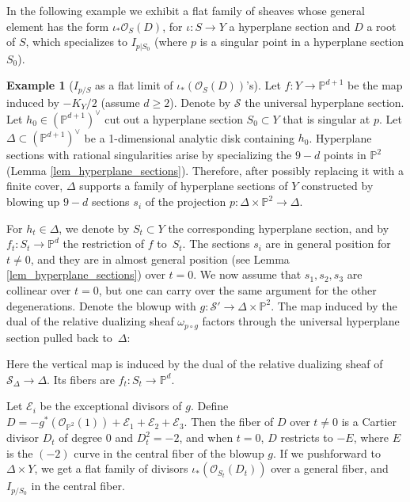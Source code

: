 \documentclass[11pt]{amsart}
\theoremstyle{definition}
\newtheorem{example}[thm]{Example}
\newcommand{\pr}[1]{\mathbb P^{#1}}
\newcommand{\sO}{\mathcal{O}}
\newcommand{\sS}{\mathcal{S}}
\newcommand{\sE}{\mathcal{E}}
\newcommand{\AAA}[1]{\textcolor{red}{#1}}
\renewcommand{\P}{\mathbb{P}}
\begin{document}
In the following example we exhibit a flat family of sheaves whose general element has the form $\iota_*\sO_S(D)$, for $\iota\colon S \to Y$ a hyperplane section and $D$ a root of $S$, which specializes to $I_{p|S_0}$ (where $p$ is a singular point in a hyperplane section $S_0$).

\begin{example}[$I_{p/S}$ as a flat limit of $\iota_*(\sO_S(D))$'s]\label{explicitfamily}
Let $f:Y\rightarrow \pr{d+1}$ be the map induced by $-K_Y/2$ (assume $d\geq 2$). Denote by $\sS$ the universal hyperplane section. Let $h_0\in (\P^{d+1})^\vee$ cut out a hyperplane section  $S_0\subset Y$ that is singular at $p$. 
Let $\Delta\subset (\P^{d+1})^\vee$ be a 1-dimensional analytic disk containing $h_0$. Hyperplane sections with rational singularities arise by specializing the $9-d$ points in $\pr 2$ (Lemma \ref{lem_hyperplane_sections}). Therefore, after possibly replacing it with a finite cover, $\Delta$ supports a family of hyperplane sections of $Y$ constructed by blowing up $9-d$ sections $s_i$ of the projection $p:\Delta\times \pr 2\rightarrow \Delta$.

For $h_t\in \Delta$, we denote by $S_t\subset Y$ the corresponding hyperplane section, and by $f_t:S_t\rightarrow \pr d$ the restriction of $f$ to~$S_t$.   The sections $s_i$ are in general position for $t\neq 0$, and they are in almost general position (see Lemma \ref{lem_hyperplane_sections}) over $t=0$. We now assume that $s_1,s_2,s_3$ are collinear over $t=0$, but one can carry over the same argument for the other degenerations. Denote the blowup with $g:\sS'\rightarrow \Delta\times \pr{2}$. The map induced by the dual of the relative dualizing sheaf $\omega_{p\circ g}$ factors through the universal hyperplane section pulled back to~$\Delta$:
\begin{center}
\end{center}
Here the vertical map is induced by the dual of the relative dualizing sheaf of $\sS_\Delta\rightarrow \Delta$. Its fibers are $f_t:S_t\rightarrow \pr d$.

Let $\sE_i$ be the exceptional divisors of $g$. Define $D=-g^\ast(\sO_{\pr{2}}(1))+\sE_1+\sE_2+\sE_3$. Then the fiber of $D$ over $t\neq 0$ is a Cartier divisor $D_t$ of degree $0$ and $D_t^2=-2$, and when $t=0$, $D$ restricts to $-E$, where $E$ is the $(-2)$ curve in the central fiber of the blowup $g$. If we pushforward to $\Delta\times Y$, we get a flat family of divisors $\iota_*(\sO_{S_t}(D_t))$ over a general fiber, and $I_{p/S_0}$ in the central fiber.
\end{example}
\end{document}
